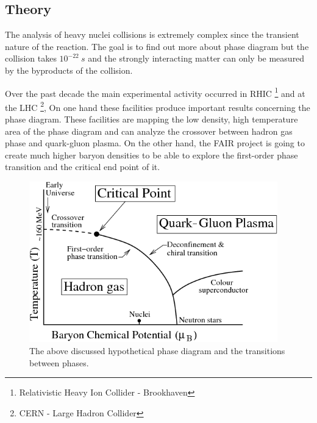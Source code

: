 \documentclass[a4paper,12pt]{article}
\begin{document}
\subsection{ Theory}
\vspace{5mm}
\par The analysis of heavy nuclei collisions is extremely complex since the transient nature of the reaction. The goal is to find out more about phase diagram but the collision takes $10^{-22}~s$ and the strongly interacting matter can only be measured by the byproducts of the collision.
\par Over the past decade the main experimental activity occurred in RHIC \footnote{ Relativistic Heavy Ion Collider - Brookhaven } and at the LHC \footnote{ CERN - Large Hadron Collider }, On one hand these facilities produce important results concerning the phase diagram. These facilities are mapping the low density, high temperature area of the phase diagram and can analyze the crossover between hadron gas phase and quark-gluon plasma. On the other hand, the FAIR project is going to create much higher baryon densities to be able to explore the first-order phase transition and the critical end point of it.
\begin{figure}[H]
	\centering
	\includegraphics[width=0.96\textwidth]{CBM_phase_trans.png}
	\caption{ The above discussed hypothetical phase diagram and the transitions between phases. }
\end{figure}
\end{document}
